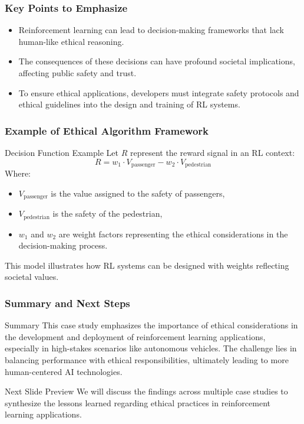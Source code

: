 \documentclass{beamer}
\begin{document}
\begin{frame}[fragile]
    \frametitle{Key Points to Emphasize}
    \begin{itemize}
        \item Reinforcement learning can lead to decision-making frameworks that lack human-like ethical reasoning.
        \item The consequences of these decisions can have profound societal implications, affecting public safety and trust.
        \item To ensure ethical applications, developers must integrate safety protocols and ethical guidelines into the design and training of RL systems.
    \end{itemize}
\end{frame}

\begin{frame}[fragile]
    \frametitle{Example of Ethical Algorithm Framework}
    \begin{block}{Decision Function Example}
        Let \( R \) represent the reward signal in an RL context: 
        \begin{equation}
            R = w_1 \cdot V_{\text{passenger}} - w_2 \cdot V_{\text{pedestrian}} 
        \end{equation}
        Where:
        \begin{itemize}
            \item \( V_{\text{passenger}} \) is the value assigned to the safety of passengers,
            \item \( V_{\text{pedestrian}} \) is the safety of the pedestrian,
            \item \( w_1 \) and \( w_2 \) are weight factors representing the ethical considerations in the decision-making process.
        \end{itemize}
        This model illustrates how RL systems can be designed with weights reflecting societal values.
    \end{block}
\end{frame}

\begin{frame}[fragile]
    \frametitle{Summary and Next Steps}
    \begin{block}{Summary}
        This case study emphasizes the importance of ethical considerations in the development and deployment of reinforcement learning applications, especially in high-stakes scenarios like autonomous vehicles. The challenge lies in balancing performance with ethical responsibilities, ultimately leading to more human-centered AI technologies.
    \end{block}

    \begin{block}{Next Slide Preview}
        We will discuss the findings across multiple case studies to synthesize the lessons learned regarding ethical practices in reinforcement learning applications.
    \end{block}
\end{frame}
\end{document}
